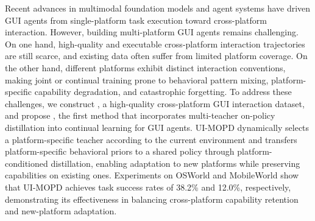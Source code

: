 


Recent advances in multimodal foundation models and agent systems have
driven GUI agents from single-platform task execution toward cross-platform
interaction. However, building multi-platform GUI agents remains
challenging. On one hand, high-quality and executable cross-platform
interaction trajectories are still scarce, and existing data often suffer
from limited platform coverage. On the other hand, different platforms exhibit
distinct interaction conventions, making joint or continual training prone
to behavioral pattern mixing, platform-specific capability degradation, and
catastrophic forgetting. To address these challenges, we construct
\BENCHhl, a high-quality cross-platform GUI interaction dataset,
and propose \METHODNAMEhl, the first method that incorporates multi-teacher on-policy distillation into continual learning for GUI agents. UI-MOPD
dynamically selects a platform-specific teacher according to the current
environment and transfers platform-specific behavioral priors to a shared
policy through platform-conditioned distillation, enabling adaptation to
new platforms while preserving capabilities on existing ones. Experiments
on OSWorld and MobileWorld show that UI-MOPD achieves task success rates
of 38.2\% and 12.0\%, respectively, demonstrating its effectiveness in
balancing cross-platform capability retention and new-platform adaptation.




